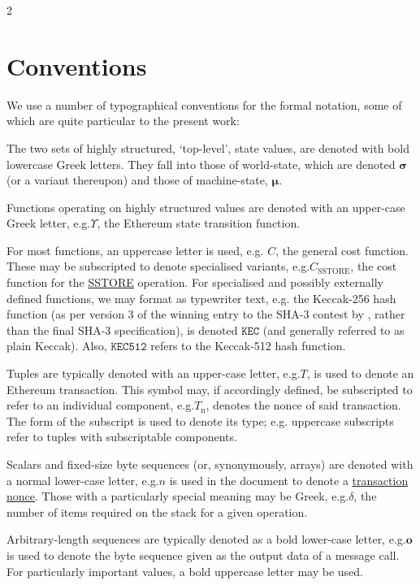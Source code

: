 \documentclass[9pt,oneside]{amsart}
\makeatletter
\newcommand*\eg{e.g.\@\xspace}
\makeatother
\begin{document}
\begin{multicols}{2}
\section{Conventions}\label{ch:conventions}

We use a number of typographical conventions for the formal notation, some of which are quite particular to the present work:

The two sets of highly structured, `top-level', state values, are denoted with bold lowercase Greek letters. They fall into those of world-state, which are denoted $\boldsymbol{\sigma}$ (or a variant thereupon) and those of machine-state, $\boldsymbol{\mu}$.

Functions operating on highly structured values are denoted with an upper-case Greek letter, \eg \hyperlink{Upsilon_state_transition}{$\Upsilon$}, the Ethereum state transition function.

For most functions, an uppercase letter is used, e.g. $C$, the general cost function. These may be subscripted to denote specialised variants, \eg \hyperlink{C__SSTORE}{$C_\text{SSTORE}$}, the cost function for the \hyperlink{SSTORE}{{\tiny SSTORE}} operation. For specialised and possibly externally defined functions, we may format as typewriter text, \eg the Keccak-256 hash function (as per version 3 of the winning entry to the SHA-3 contest by \cite{Keccak}, rather than the final SHA-3 specification), is denoted $\texttt{KEC}$ (and generally referred to as plain Keccak). Also, $\texttt{KEC512}$ refers to the Keccak-512 hash function.

Tuples are typically denoted with an upper-case letter, \eg $T$, is used to denote an Ethereum transaction. This symbol may, if accordingly defined, be subscripted to refer to an individual component, \eg \hyperlink{transaction_nonce}{$T_{\mathrm{n}}$}, denotes the nonce of said transaction. The form of the subscript is used to denote its type; \eg uppercase subscripts refer to tuples with subscriptable components.

Scalars and fixed-size byte sequences (or, synonymously, arrays) are denoted with a normal lower-case letter, \eg $n$ is used in the document to denote a \hyperlink{transaction_nonce}{transaction nonce}. Those with a particularly special meaning may be Greek, \eg $\delta$, the number of items required on the stack for a given operation.

Arbitrary-length sequences are typically denoted as a bold lower-case letter, \eg $\mathbf{o}$ is used to denote the byte sequence given as the output data of a message call. For particularly important values, a bold uppercase letter may be used.


\end{multicols}
\end{document}
